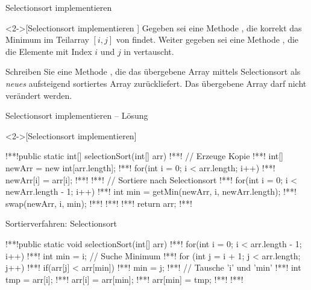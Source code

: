 \ifull
\begin{frame}[c]{Selectionsort implementieren}
    \begin{exercise}<2->[Selectionsort implementieren ]
        \pause{}Gegeben sei eine Methode , die korrekt das Minimum im Teilarray \([i, j]\) von  findet. Weiter gegeben sei eine Methode , die die Elemente mit Index \(i\) und \(j\) in  vertauscht.\medskip\par\pause Schreiben Sie eine Methode , die das übergebene Array mittels Selectionsort als \emph{neues} aufsteigend sortiertes Array zurückliefert. Das übergebene Array darf nicht verändert werden.
    \end{exercise}
\end{frame}

\begin{frame}[fragile,c]{Selectionsort implementieren -- Lösung}
    \begin{solve}<2->[Selectionsort implementieren]
\begin{plainjava}
!**!public static int[] selectionSort(int[] arr) {
!**!    // Erzeuge Kopie
!**!    int[] newArr = new int[arr.length];
!**!    for(int i = 0; i < arr.length; i++)
!**!        newArr[i] = arr[i];
!**!
!**!    // Sortiere nach Selectionsort
!**!    for(int i = 0; i < newArr.length - 1; i++) {
!**!        int min = getMin(newArr, i, newArr.length);
!**!        swap(newArr, i, min);
!**!    }
!**!
!**!    return arr;
!**!}
\end{plainjava}
    \end{solve}
\end{frame}
\fi

\begin{frame}[fragile,c]{Sortierverfahren: Selectionsort}
    \begin{plainjava}
!**!public static void selectionSort(int[] arr) {
!**!    for(int i = 0; i < arr.length - 1; i++) {
!**!        int min = i; // Suche Minimum
!**!        for (int j = i + 1; j < arr.length; j++)
!**!            if(arr[j] < arr[min])
!**!                min = j;
!**!        // Tausche 'i' und 'min'
!**!        int tmp = arr[i];
!**!        arr[i] = arr[min];
!**!        arr[min] = tmp;
!**!    }
!**!}
    \end{plainjava}
\end{frame}

